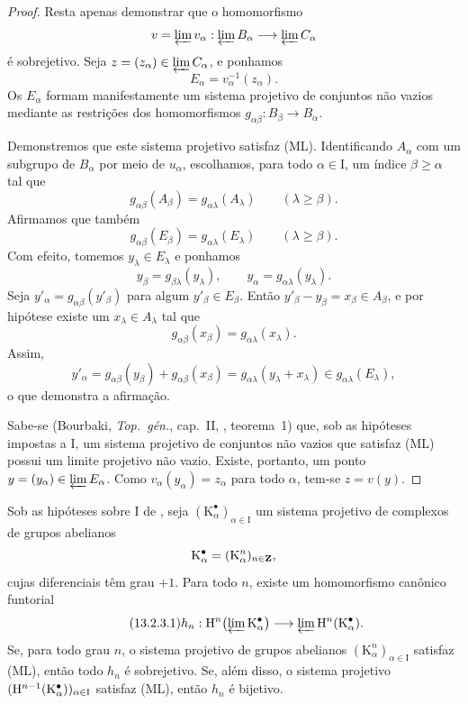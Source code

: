 \begin{proof}
Resta apenas demonstrar que o homomorfismo
\[
  v=\varprojlim v_\alpha:
  \varprojlim B_\alpha\longrightarrow\varprojlim C_\alpha
\]
é sobrejetivo.
Seja $z=(z_\alpha)\in\varprojlim C_\alpha$, e ponhamos
\[
  E_\alpha=v_\alpha^{-1}(z_\alpha).
\]
Os $E_\alpha$ formam manifestamente um sistema projetivo de conjuntos não
vazios mediante as restrições dos homomorfismos
$g_{\alpha\beta}:B_\beta\longrightarrow B_\alpha$.

Demonstremos que este sistema projetivo satisfaz (ML).
Identificando $A_\alpha$ com um subgrupo de $B_\alpha$ por meio de
$u_\alpha$, escolhamos, para todo $\alpha\in\mathrm{I}$, um índice
$\beta\geq\alpha$ tal que
\[
  g_{\alpha\beta}(A_\beta)
  =
  g_{\alpha\lambda}(A_\lambda)
  \qquad(\lambda\geq\beta).
\]
Afirmamos que também
\[
  g_{\alpha\beta}(E_\beta)
  =
  g_{\alpha\lambda}(E_\lambda)
  \qquad(\lambda\geq\beta).
\]
Com efeito, tomemos $y_\lambda\in E_\lambda$ e ponhamos
\[
  y_\beta=g_{\beta\lambda}(y_\lambda),
  \qquad
  y_\alpha=g_{\alpha\lambda}(y_\lambda).
\]
Seja $y'_\alpha=g_{\alpha\beta}(y'_\beta)$ para algum
$y'_\beta\in E_\beta$.
Então $y'_\beta-y_\beta=x_\beta\in A_\beta$, e por hipótese existe
um $x_\lambda\in A_\lambda$ tal que
\[
  g_{\alpha\beta}(x_\beta)
  =
  g_{\alpha\lambda}(x_\lambda).
\]
Assim,
\[
  y'_\alpha
  =
  g_{\alpha\beta}(y_\beta)+g_{\alpha\beta}(x_\beta)
  =
  g_{\alpha\lambda}(y_\lambda+x_\lambda)
  \in g_{\alpha\lambda}(E_\lambda),
\]
o que demonstra a afirmação.

Sabe-se (Bourbaki, \emph{Top.\ g\'{e}n.}, cap.~II,
, teorema~1) que, sob as hipóteses impostas a
$\mathrm{I}$, um sistema projetivo de conjuntos não vazios que satisfaz (ML)
possui um limite projetivo não vazio.
Existe, portanto, um ponto
$y=(y_\alpha)\in\varprojlim E_\alpha$.
Como $v_\alpha(y_\alpha)=z_\alpha$ para todo $\alpha$, tem-se
$z=v(y)$.
\end{proof}

\begin{proposition}[13.2.3]
\label{0.13.2.3}
Sob as hipóteses sobre $\mathrm{I}$ de , seja
$(\mathrm{K}^\bullet_\alpha)_{\alpha\in\mathrm{I}}$ um sistema projetivo
de complexos de grupos abelianos
\[
  \mathrm{K}^\bullet_\alpha
  =
  (\mathrm{K}^n_\alpha)_{n\in\mathbf{Z}},
\]
cujas diferenciais têm grau $+1$.
Para todo $n$, existe um homomorfismo canônico funtorial
\begin{equation}
\label{0.13.2.3.1}
\tag{13.2.3.1}
  h_n:
  \HH^n\bigl(\varprojlim\mathrm{K}^\bullet_\alpha\bigr)
  \longrightarrow
  \varprojlim\HH^n(\mathrm{K}^\bullet_\alpha).
\end{equation}
Se, para todo grau $n$, o sistema projetivo de grupos abelianos
$(\mathrm{K}^n_\alpha)_{\alpha\in\mathrm{I}}$ satisfaz {\rm(ML)},
então todo $h_n$ é sobrejetivo.
Se, além disso, o sistema projetivo
$(\mathrm{H}^{n-1}(\mathrm{K}^\bullet_\alpha))_{\alpha\in\mathrm{I}}$
satisfaz {\rm(ML)}, então $h_n$ é bijetivo.
\end{proposition}


